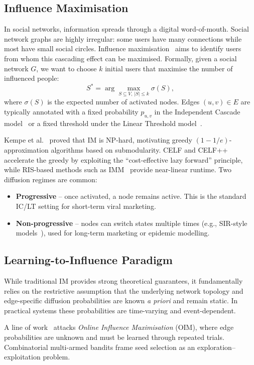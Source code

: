 \documentclass[conference]{IEEEtran}
\begin{document}
\subsection{Influence Maximisation}
In social networks, information spreads through a digital
word-of-mouth. Social network graphs are highly irregular: some users
have many connections while most have small social circles. Influence
maximisation~\cite{Influencemax} aims to identify users from whom this
cascading effect can be maximised. Formally, given a social network
$G$, we want to choose $k$ initial users that maximise the number of
influenced people:
\[
S^{*}=\arg\max_{S\subseteq V,\,|S|\le k}\sigma(S),
\]
where $\sigma(S)$ is the expected number of activated nodes. Edges
$(u,v)\in E$ are typically annotated with a fixed probability $p_{u,v}$
in the Independent Cascade
model~\cite{shakarian2015independent,wang2012scalable} or a fixed
threshold under the Linear Threshold model~\cite{shakarian2015independent}.

Kempe et al.~\cite{Kempe} proved that IM is NP-hard, motivating greedy
$(1-1/e)$-approximation algorithms based on submodularity. CELF and
CELF++~\cite{leskovec2007celf} accelerate the greedy by exploiting the
``cost-effective lazy forward'' principle, while RIS-based methods such
as IMM~\cite{tang2015imm} provide near-linear runtime. Two diffusion
regimes are common:
\begin{itemize}
    \item \textbf{Progressive} -- once activated, a node remains
    active. This is the standard IC/LT setting for short-term viral
    marketing.
    \item \textbf{Non-progressive} -- nodes can switch states multiple
    times (e.g., SIR-style models~\cite{Influencemax}), used for
    long-term marketing or epidemic modelling.
\end{itemize}

\subsection{Learning-to-Influence Paradigm}
While traditional IM provides strong theoretical guarantees, it
fundamentally relies on the restrictive assumption that the underlying
network topology and edge-specific diffusion probabilities are known
\emph{a priori} and remain static. In practical systems these
probabilities are time-varying and event-dependent.

A line of work~\cite{IM_bandits,IM_bandits2,IM_bandits3} attacks
\emph{Online Influence Maximisation} (OIM), where edge probabilities
are unknown and must be learned through repeated trials. Combinatorial
multi-armed bandits frame seed selection as an
exploration--exploitation problem.
\end{document}
